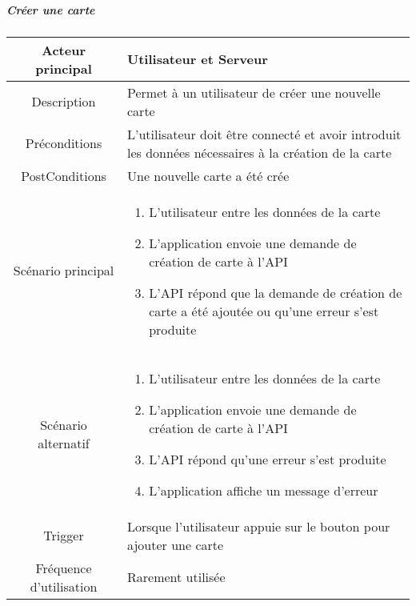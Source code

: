 \documentclass{article}
\begin{document}
    \newpage

\subparagraph{Créer une carte}
    \begin{table}[h]
        \begin{tabular}{|c|p{10cm}|}
        \hline
        Acteur principal& Utilisateur et Serveur \\
        \hline
        Description& Permet à un utilisateur de créer une nouvelle carte \\
        \hline
        Préconditions& L'utilisateur doit être connecté et avoir introduit les données nécessaires
            à la création de la carte \\
        \hline
        PostConditions&  Une nouvelle carte a été crée\\
        \hline
        Scénario principal& 
                \begin{enumerate}
                    \item L'utilisateur entre les données de la carte
                    \item L'application envoie une demande de création de carte à l'API
                    \item L'API répond que la demande de création de carte a été ajoutée ou qu'une erreur s'est produite
                \end{enumerate}     \\
        \hline
        Scénario alternatif& 
            \begin{enumerate}
                \item L'utilisateur entre les données de la carte
                \item L'application envoie une demande de création de carte à l'API
                \item L'API répond qu'une erreur s'est produite
                \item L'application affiche un message d'erreur
            \end{enumerate}     \\
        \hline
        Trigger&  Lorsque l'utilisateur appuie sur le bouton pour ajouter une carte   \\
        \hline
        Fréquence d'utilisation& Rarement utilisée  \\
        \hline
        \end{tabular}
    \end{table}

    \newpage
\end{document}
